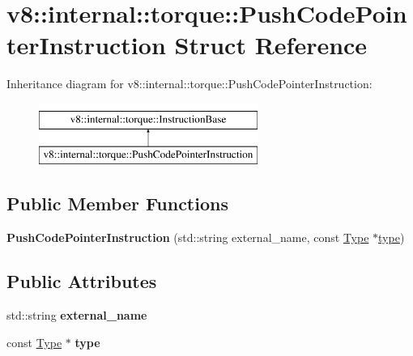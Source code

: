 \hypertarget{structv8_1_1internal_1_1torque_1_1PushCodePointerInstruction}{}\section{v8\+:\+:internal\+:\+:torque\+:\+:Push\+Code\+Pointer\+Instruction Struct Reference}
\label{structv8_1_1internal_1_1torque_1_1PushCodePointerInstruction}
Inheritance diagram for v8\+:\+:internal\+:\+:torque\+:\+:Push\+Code\+Pointer\+Instruction\+:\begin{figure}[H]
\begin{center}
\leavevmode
\includegraphics[height=2.000000cm]{structv8_1_1internal_1_1torque_1_1PushCodePointerInstruction}
\end{center}
\end{figure}
\subsection*{Public Member Functions}
\begin{DoxyCompactItemize}
\item 
\mbox{\label{structv8_1_1internal_1_1torque_1_1PushCodePointerInstruction_a2b8f0c36d47a8abd806ff89cb1587b9b}} 
{\bfseries Push\+Code\+Pointer\+Instruction} (std\+::string external\+\_\+name, const \mbox{\hyperlink{classv8_1_1internal_1_1torque_1_1Type}{Type}} $\ast$\mbox{\hyperlink{classstd_1_1conditional_1_1type}{type}})
\end{DoxyCompactItemize}
\subsection*{Public Attributes}
\begin{DoxyCompactItemize}
\item 
\mbox{\label{structv8_1_1internal_1_1torque_1_1PushCodePointerInstruction_adb00c5bdab4e25593fc1f14c65fc0c06}} 
std\+::string {\bfseries external\+\_\+name}
\item 
\mbox{\label{structv8_1_1internal_1_1torque_1_1PushCodePointerInstruction_ad201530fd6fef99391927c1bbf545e2f}} 
const \mbox{\hyperlink{classv8_1_1internal_1_1torque_1_1Type}{Type}} $\ast$ {\bfseries type}
\end{DoxyCompactItemize}


